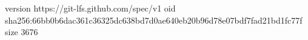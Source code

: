 version https://git-lfs.github.com/spec/v1
oid sha256:66bb0b6dac361c36325dc638bd7d0ae640eb20b96d78e07bdf7fad21bd1fc77f
size 3676
